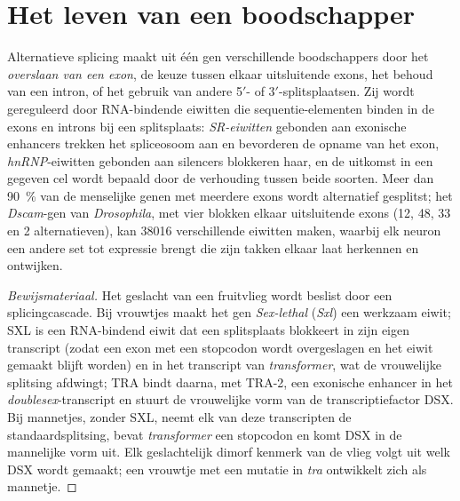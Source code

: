 \section{Het leven van een boodschapper}

\begin{definition}\label{def:b3:rna-regulation:splicing}
Alternatieve splicing maakt uit één gen verschillende boodschappers
door het \emph{overslaan van een exon}, de keuze tussen elkaar
uitsluitende exons, het behoud van een intron, of het gebruik van
andere 5$'$- of 3$'$-splitsplaatsen. Zij wordt gereguleerd door
RNA-bindende eiwitten die sequentie-elementen binden in de exons en
introns bij een splitsplaats: \emph{SR-eiwitten} gebonden aan
exonische enhancers trekken het spliceosoom aan en bevorderen de
opname van het exon, \emph{hnRNP}-eiwitten gebonden aan silencers
blokkeren haar, en de uitkomst in een gegeven cel wordt bepaald door
de verhouding tussen beide soorten. Meer dan \qty{90}{\%} van de
menselijke genen met meerdere exons wordt alternatief gesplitst; het
\emph{Dscam}-gen van \emph{Drosophila}, met vier blokken elkaar
uitsluitende exons (12, 48, 33 en 2 alternatieven), kan \num{38016}
verschillende eiwitten maken, waarbij elk neuron een andere set tot
expressie brengt die zijn takken elkaar laat herkennen en ontwijken.
\end{definition}

\begin{proof}[Bewijsmateriaal]
Het geslacht van een fruitvlieg wordt beslist door een
splicingcascade. Bij vrouwtjes maakt het gen \emph{Sex-lethal}
(\emph{Sxl}) een werkzaam eiwit; SXL is een RNA-bindend eiwit dat een
splitsplaats blokkeert in zijn eigen transcript (zodat een exon met
een stopcodon wordt overgeslagen en het eiwit gemaakt blijft worden)
en in het transcript van \emph{transformer}, wat de vrouwelijke
splitsing afdwingt; TRA bindt daarna, met TRA-2, een exonische
enhancer in het \emph{doublesex}-transcript en stuurt de vrouwelijke
vorm van de transcriptiefactor DSX. Bij mannetjes, zonder SXL, neemt
elk van deze transcripten de standaardsplitsing, bevat
\emph{transformer} een stopcodon en komt DSX in de mannelijke vorm
uit. Elk geslachtelijk dimorf kenmerk van de vlieg volgt uit welk DSX
wordt gemaakt; een vrouwtje met een mutatie in \emph{tra} ontwikkelt
zich als mannetje.
\end{proof}

